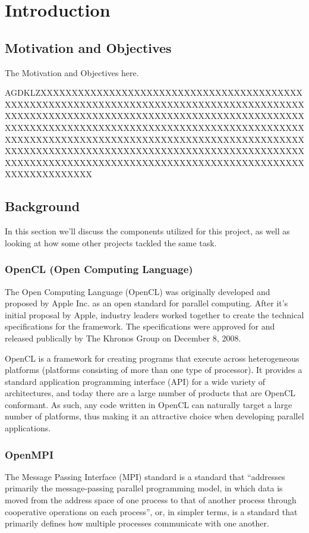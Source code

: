 \documentclass[../thesis.tex]{subfiles}
\begin{document}
\chapter{Introduction}

\section{Motivation and Objectives}
The
Motivation and Objectives here.




AGDKLZXXXXXXXXXXXXXXXXXXXXXXXXXXXXXXXXXXXXXXXXXXXXXXXXXXXXXXXXXXXXXXXXXXXXXXXXXXXXXXXXXXXXXXXXXXXXXXXXXXXXXXXXXXXXXXXXXXXXXXXXXXXXXXXXXXXXXXXXXXXXXXXXXXXXXXXXXXXXXXXXXXXXXXXXXXXXXXXXXXXXXXXXXXXXXXXXXXXXXXXXXXXXXXXXXXXXXXXXXXXXXXXXXXXXXXXXXXXXXXXXXXXXXXXXXXXXXXXXXXXXXXXXXXXXXXXXXXXXXXXXXXXXXXXXXXXXXXXXXXXXXXXXXXXXXXXXXXXXXXXXXXXXXXXXXXXXXXXXXXXXXXXX

\section{Background}
    In this section we'll discuss the components utilized for this project, as well as looking at how some other projects tackled the same task.

    \subsection{OpenCL (Open Computing Language)} %
    \label{sub:opencl}
        The Open Computing Language (OpenCL) was originally developed and proposed by Apple Inc. as an open standard for parallel computing. After it's initial proposal by Apple, industry leaders worked together to create the technical specifications for the framework. The specifications were approved for and released publically by The Khronos Group on December 8, 2008\cite{opencl10pressrelease}.

        OpenCL is a framework for creating programs that execute across heterogeneous platforms (platforms consisting of more than one type of processor). It provides a standard application programming interface (API) for a wide variety of architectures, and today there are a large number of products that are OpenCL conformant\cite{khronosconformance}. As such, any code written in OpenCL can naturally target a large number of platforms, thus making it an attractive choice when developing parallel applications.  

    \subsection{OpenMPI} %
    \label{sub:openmpi}
        The Message Passing Interface (MPI) standard is a standard that ``addresses primarily the message-passing parallel programming model, in which data is moved from the address space of one process to that of another process through cooperative operations on each process''\cite{MPI-2.2}, or, in simpler terms, is a standard that primarily defines how multiple processes communicate with one another. 
\end{document}
